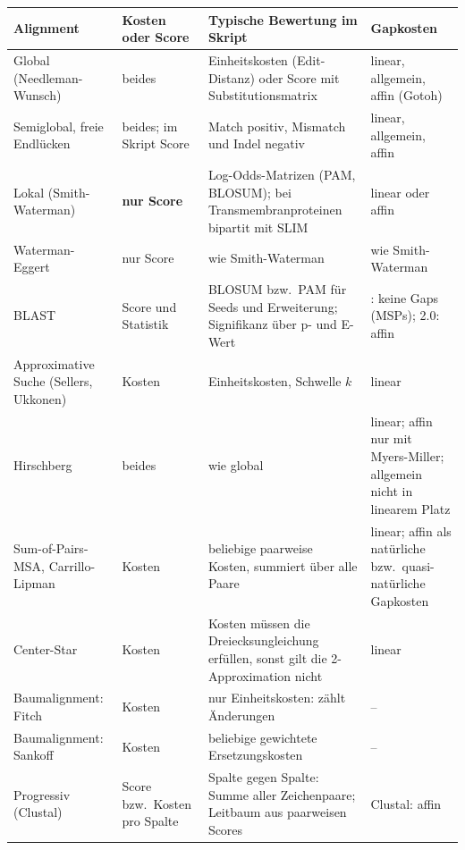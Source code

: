 \begin{table}[H]
    \centering
    \small
    \setlength{\tabcolsep}{4pt}
    \renewcommand{\arraystretch}{1.15}
    \begin{tabular}{>{\raggedright\arraybackslash}p{2.5cm}
            >{\raggedright\arraybackslash}p{1.9cm}
            >{\raggedright\arraybackslash}p{4.3cm}
            >{\raggedright\arraybackslash}p{2.3cm}}
        \toprule
        \textbf{Alignment} & \textbf{Kosten oder Score} & \textbf{Typische Bewertung im Skript} & \textbf{Gapkosten} \\
        \midrule
        Global (Needleman-Wunsch) & beides & Einheitskosten (Edit-Distanz) oder Score mit Substitutionsmatrix & linear, allgemein, affin (Gotoh) \\
        Semiglobal, freie Endlücken & beides; im Skript Score & Match positiv, Mismatch und Indel negativ & linear, allgemein, affin \\
        Lokal (Smith-Waterman) & \textbf{nur Score} & Log-Odds-Matrizen (PAM, BLOSUM); bei Transmembranproteinen bipartit mit SLIM & linear oder affin \\
        Waterman-Eggert & nur Score & wie Smith-Waterman & wie Smith-Waterman \\
        BLAST & Score und Statistik & BLOSUM bzw.\ PAM für Seeds und Erweiterung; Signifikanz über p- und E-Wert & 1.4: keine Gaps (MSPs); 2.0: affin \\
        Approximative Suche (Sellers, Ukkonen) & Kosten & Einheitskosten, Schwelle $k$ & linear \\
        Hirschberg & beides & wie global & linear; affin nur mit Myers-Miller; allgemein nicht in linearem Platz \\
        Sum-of-Pairs-MSA, Carrillo-Lipman & Kosten & beliebige paarweise Kosten, summiert über alle Paare & linear; affin als natürliche bzw.\ quasi-natürliche Gapkosten \\
        Center-Star & Kosten & Kosten müssen die Dreiecksungleichung erfüllen, sonst gilt die 2-Approximation nicht & linear \\
        Baumalignment: Fitch & Kosten & nur Einheitskosten: zählt Änderungen & -- \\
        Baumalignment: Sankoff & Kosten & beliebige gewichtete Ersetzungskosten & -- \\
        Progressiv (Clustal) & Score bzw.\ Kosten pro Spalte & Spalte gegen Spalte: Summe aller Zeichenpaare; Leitbaum aus paarweisen Scores & Clustal: affin \\

\end{tabular}
\end{table}
